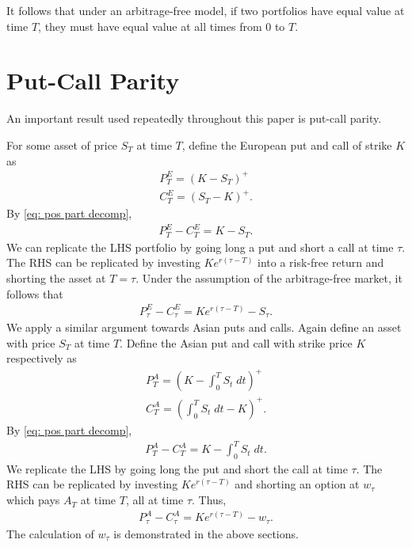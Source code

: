 \documentclass[reqno]{amsart}
\begin{document}
It follows that under an arbitrage-free model, if two portfolios have equal value at time $T$, they must have equal value at all times from $0$ to $T$.

\section{Put-Call Parity}\label{PC parity appendix}

An important result used repeatedly throughout this paper is put-call parity. 

For some asset of price $S_T$ at time $T$, define the European put and call of strike $K$ as 
\begin{align} 
     P^E_T = (K - S_T)^+ \\
     C^E_T = (S_T - K)^+.
\end{align}
By \eqref{eq: pos part decomp}, 
\begin{align} \label{Put-Call Parity European}
     P^E_T - C^E_T = K - S_T.
\end{align}
We can replicate the LHS portfolio by going long a put and short a call at time $\tau$. 
The RHS can be replicated by investing $Ke^{r(\tau - T)}$ into a risk-free return and shorting the asset at $T = \tau$.
Under the assumption of the arbitrage-free market, it follows that
\begin{align} 
     P^E_\tau - C^E_\tau = Ke^{r(\tau - T)} - S_\tau.
\end{align}
We apply a similar argument towards Asian puts and calls.
Again define an asset with price $S_T$ at time $T$.
Define the Asian put and call with strike price $K$ respectively as
\begin{align} 
     P^A_T = (K - \int_0^T S_t \;dt)^+ \\
     C^A_T = (\int_0^T S_t \;dt - K)^+.
\end{align}
By \eqref{eq: pos part decomp}, 
\begin{align} 
     P^A_T - C^A_T = K - \int_0^T S_t \;dt.
\end{align}
We replicate the LHS by going long the put and short the call at time $\tau$.
The RHS can be replicated by investing $Ke^{r(\tau - T)}$ and shorting an option at $w_\tau$ which pays $A_T$ at time $T$, all at time $\tau$.
Thus, 
\begin{align} \label{Put-Call Parity Asian}
     P^A_\tau - C^A_\tau = Ke^{r(\tau - T)} - w_\tau.
\end{align}
The calculation of $w_\tau$ is demonstrated in the above sections.
\end{document}
